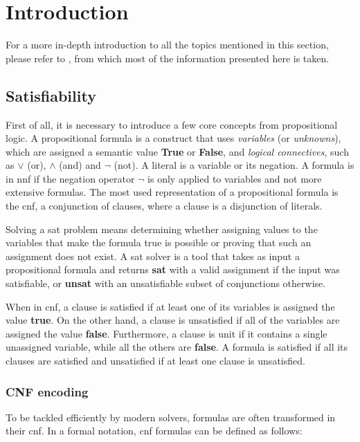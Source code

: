 \chapter{Introduction}

For a more in-depth introduction to all the topics mentioned in this section, please refer to \cite{book:handbook-sat,paper:survey-smt,book:lp}, from which most of the information presented here is taken.

\section{Satisfiability}

First of all, it is necessary to introduce a few core concepts from propositional logic.
A propositional formula is a construct that uses \textit{variables} (or \textit{unknowns}), which are assigned a semantic value \textbf{True} or \textbf{False}, and \textit{logical connectives}, such as $\lor$ (or), $\land$ (and) and $\neg$ (not).
A literal is a variable or its negation.
A formula is in \gls{nnf} if the negation operator $\neg$ is only applied to variables and not more extensive formulas.
The most used representation of a propositional formula is the \gls{cnf}, a conjunction of clauses, where a clause is a disjunction of literals.

Solving a \gls{sat} problem means determining whether assigning values to the variables that make the formula true is possible or proving that such an assignment does not exist.
A \gls{sat} solver is a tool that takes as input a propositional formula and returns \textbf{sat} with a valid assignment if the input was satisfiable, or \textbf{unsat} with an unsatisfiable subset of conjunctions otherwise.

When in \gls{cnf}, a clause is satisfied if at least one of its variables is assigned the value \textbf{true}.
On the other hand, a clause is unsatisfied if all of the variables are assigned the value \textbf{false}.
Furthermore, a clause is unit if it contains a single unassigned variable, while all the others are \textbf{false}.
A formula is satisfied if all its clauses are satisfied and unsatisfied if at least one clause is unsatisfied.

\subsection*{CNF encoding}

To be tackled efficiently by modern solvers, formulas are often transformed in their \gls{cnf}.
In a formal notation, \gls{cnf} formulas can be defined as follows:

